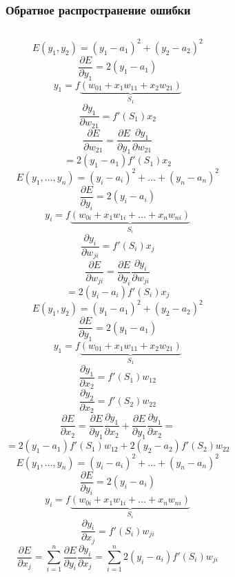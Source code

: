 \documentclass[24pt,pdf,hyperref={unicode}]{beamer}
\newcommand{\dd}[2]{\frac{\partial #1}{\partial #2}}
\begin{document}
\begin{frame}\frametitle{Обратное распространение ошибки}
\begin{columns}


{
$$
E(y_1,y_2)=(y_1-a_1)^2+(y_2-a_2)^2
$$
$$
\dd{E}{y_1}=2(y_1-a_1)
$$
$$
y_1=f\underbrace{(w_{01}+x_1w_{11}+x_2w_{21})}_{S_1}
$$
$$
\dd{y_1}{w_{21}}=f'(S_1)x_2
$$
$$
\dd{E}{w_{21}}=\dd{E}{y_1}\dd{y_1}{w_{21}}
$$
$$
=2(y_1-a_1)f'(S_1)x_2
$$
}
{
$$
E(y_1,...,y_n)=(y_i-a_i)^2+...+(y_n-a_n)^2
$$
$$
\dd{E}{y_i}=2(y_i-a_i)
$$
$$
y_i=f\underbrace{(w_{0i}+x_1w_{1i}+...+x_nw_{ni})}_{S_i}
$$
$$
\dd{y_i}{w_{ji}}=f'(S_i)x_j
$$
$$
\dd{E}{w_{ji}}=\dd{E}{y_i}\dd{y_i}{w_{ji}}
$$
$$
=2(y_i-a_i)f'(S_i)x_j
$$
}
{
$$
E(y_1,y_2)=(y_1-a_1)^2+(y_2-a_2)^2
$$
$$
\dd{E}{y_1}=2(y_1-a_1)
$$
$$
y_1=f\underbrace{(w_{01}+x_1w_{11}+x_2w_{21})}_{S_1}
$$
$$
\dd{y_1}{x_2}=f'(S_1)w_{12}
$$
$$
\dd{y_2}{x_2}=f'(S_2)w_{22}
$$
$$
\dd{E}{x_2}=\dd{E}{y_1}\dd{y_1}{x_2}+\dd{E}{y_1}\dd{y_1}{x_2}=
$$
$$
=2(y_1-a_1)f'(S_1)w_{12}+2(y_2-a_2)f'(S_2)w_{22}
$$
}
{
$$
E(y_1,...,y_n)=(y_i-a_i)^2+...+(y_n-a_n)^2
$$
$$
\dd{E}{y_i}=2(y_i-a_i)
$$
$$
y_i=f\underbrace{(w_{0i}+x_1w_{1i}+...+x_nw_{ni})}_{S_i}
$$
$$
\dd{y_i}{x_j}=f'(S_i)w_{ji}
$$
$$
\dd{E}{x_j}=\sum_{i=1}^{n} \dd{E}{y_i}\dd{y_i}{x_j}=\sum_{i=1}^{n}2(y_i-a_i)f'(S_i)w_{ji}
$$
}

\end{columns}
\end{frame}
\end{document}

